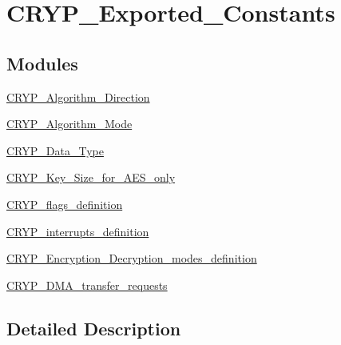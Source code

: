 \hypertarget{group___c_r_y_p___exported___constants}{\section{C\-R\-Y\-P\-\_\-\-Exported\-\_\-\-Constants}
\label{group___c_r_y_p___exported___constants}
}
\subsection*{Modules}
\begin{DoxyCompactItemize}
\item 
\hyperlink{group___c_r_y_p___algorithm___direction}{C\-R\-Y\-P\-\_\-\-Algorithm\-\_\-\-Direction}
\item 
\hyperlink{group___c_r_y_p___algorithm___mode}{C\-R\-Y\-P\-\_\-\-Algorithm\-\_\-\-Mode}
\item 
\hyperlink{group___c_r_y_p___data___type}{C\-R\-Y\-P\-\_\-\-Data\-\_\-\-Type}
\item 
\hyperlink{group___c_r_y_p___key___size__for___a_e_s__only}{C\-R\-Y\-P\-\_\-\-Key\-\_\-\-Size\-\_\-for\-\_\-\-A\-E\-S\-\_\-only}
\item 
\hyperlink{group___c_r_y_p__flags__definition}{C\-R\-Y\-P\-\_\-flags\-\_\-definition}
\item 
\hyperlink{group___c_r_y_p__interrupts__definition}{C\-R\-Y\-P\-\_\-interrupts\-\_\-definition}
\item 
\hyperlink{group___c_r_y_p___encryption___decryption__modes__definition}{C\-R\-Y\-P\-\_\-\-Encryption\-\_\-\-Decryption\-\_\-modes\-\_\-definition}
\item 
\hyperlink{group___c_r_y_p___d_m_a__transfer__requests}{C\-R\-Y\-P\-\_\-\-D\-M\-A\-\_\-transfer\-\_\-requests}
\end{DoxyCompactItemize}


\subsection{Detailed Description}
